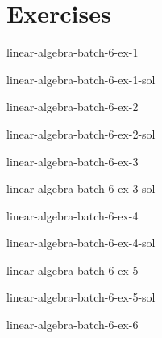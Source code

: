 \documentclass[preview]{standalone}
\begin{document}
\genpage

\section{Exercises}

\begin{snippetexercise}{linear-algebra-batch-6-ex-1}{}
    \todo
\end{snippetexercise}

\begin{snippetsolution}{linear-algebra-batch-6-ex-1-sol}{}
    \todo
\end{snippetsolution}

\begin{snippetexercise}{linear-algebra-batch-6-ex-2}{}
    \todo
\end{snippetexercise}

\begin{snippetsolution}{linear-algebra-batch-6-ex-2-sol}{}
    \todo
\end{snippetsolution}

\begin{snippetexercise}{linear-algebra-batch-6-ex-3}{}
    \todo
\end{snippetexercise}

\begin{snippetsolution}{linear-algebra-batch-6-ex-3-sol}{}
    \todo
\end{snippetsolution}

\begin{snippetexercise}{linear-algebra-batch-6-ex-4}{}
    \todo
\end{snippetexercise}

\begin{snippetsolution}{linear-algebra-batch-6-ex-4-sol}{}
    \todo
\end{snippetsolution}

\begin{snippetexercise}{linear-algebra-batch-6-ex-5}{}
    \todo
\end{snippetexercise}

\begin{snippetsolution}{linear-algebra-batch-6-ex-5-sol}{}
    \todo
\end{snippetsolution}

\begin{snippetexercise}{linear-algebra-batch-6-ex-6}{}
    \todo
\end{snippetexercise}
\end{document}
